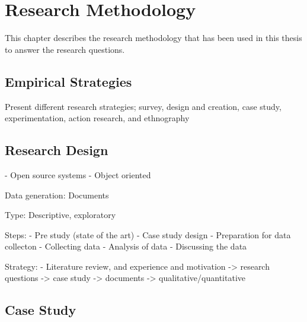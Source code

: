 
\chapter{Research Methodology}

This chapter describes the research methodology that has been used in this thesis to answer the research questions. 

\section{Empirical Strategies}
Present different research strategies; survey, design and creation, case study, experimentation, action research, and ethnography




\section{Research Design}

- Open source systems
- Object oriented


Data generation: Documents

Type: Descriptive, exploratory

Steps:
- Pre study (state of the art)
- Case study design
- Preparation for data collecton
- Collecting data
- Analysis of data
- Discussing the data            


Strategy:
- Literature review, and experience and motivation -> research questions -> case study -> documents -> qualitative/quantitative



\section{Case Study}


